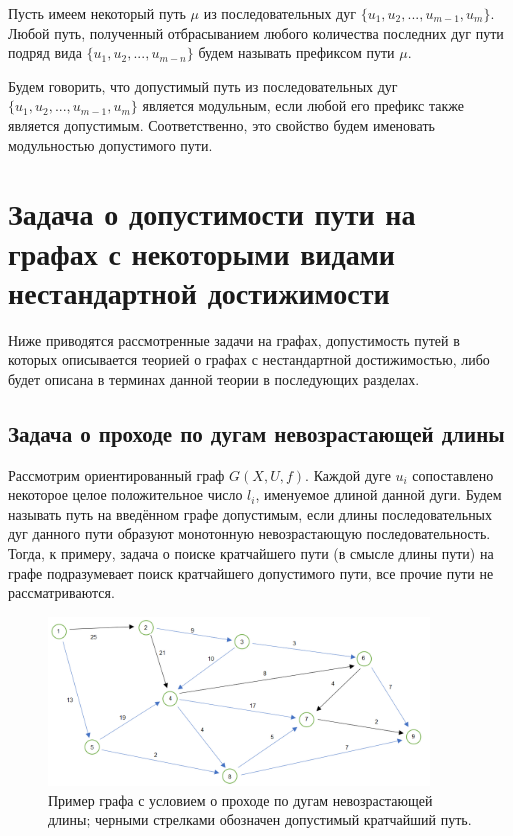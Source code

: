 \begin{definition}
	Пусть имеем некоторый путь $\mu$ из последовательных дуг $\{u_1, u_2, ... , u_{m-1}, u_m\}$. Любой путь, полученный отбрасыванием любого количества последних дуг пути подряд вида $\{u_1, u_2, ... , u_{m-n} \}$ будем называть префиксом пути $\mu$.
\end{definition}

\begin{definition}
	Будем говорить, что допустимый путь из последовательных дуг $\{u_1, u_2, ... , u_{m-1}, u_m\}$ является модульным, если любой его префикс также является допустимым. Соответственно, это свойство будем именовать модульностью допустимого пути. 
\end{definition}

\section{Задача о допустимости пути на графах с некоторыми видами нестандартной достижимости}

Ниже приводятся рассмотренные задачи на графах, допустимость путей в которых описывается теорией о графах с нестандартной достижимостью, либо будет описана в терминах данной теории в последующих разделах. 

\subsection{Задача о проходе по дугам невозрастающей длины}

Рассмотрим ориентированный граф $G(X,U,f)$. Каждой дуге $u_i$ сопоставлено некоторое целое положительное число $l_i$, именуемое длиной данной дуги. Будем называть путь на введённом графе допустимым, если длины последовательных дуг данного пути образуют монотонную невозрастающую последовательность. Тогда, к примеру, задача о поиске кратчайшего пути (в смысле длины пути) на графе подразумевает поиск кратчайшего допустимого пути, все прочие пути не рассматриваются. 

\begin{figure}
	\centering	
	{\includegraphics[width=0.9\textwidth]{img/11.png}}
	{Пример графа с условием о проходе по дугам невозрастающей длины; черными стрелками обозначен допустимый кратчайший путь.}
	\label{fig:pic_1}
\end{figure}

